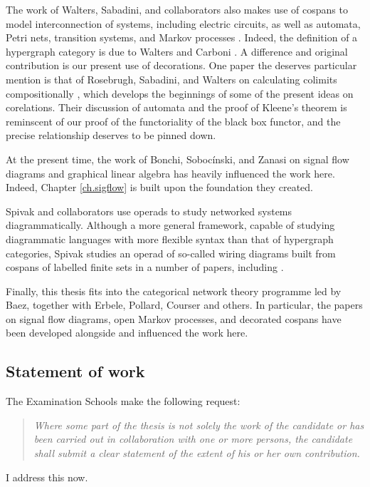 The work of Walters, Sabadini, and collaborators also makes use of cospans to
model interconnection of systems, including electric circuits, as well as
automata, Petri nets, transition systems, and Markov processes \cite{KSW,KSW2,
RSW05,RSW08,ASW}. Indeed, the definition of a hypergraph category is due to
Walters and Carboni \cite{Car91}. A difference and original contribution is our
present use of decorations. One paper the deserves particular mention is that of
Rosebrugh, Sabadini, and Walters on calculating colimits compositionally
\cite{RSW08}, which develops the beginnings of some of the present ideas on
corelations. Their discussion of automata and the proof of Kleene's theorem is
reminscent of our proof of the functoriality of the black box functor, and the
precise relationship deserves to be pinned down.

At the present time, the work of Bonchi, Soboc\'inski, and Zanasi on signal flow
diagrams and graphical linear algebra \cite{BSZ,BSZ2,BSZ3,Za} has heavily
influenced the work here. Indeed, Chapter \ref{ch.sigflow} is built upon the
foundation they created.

Spivak and collaborators use operads to study networked systems
diagrammatically. Although a more general framework, capable of studying
diagrammatic languages with more flexible syntax than that of hypergraph
categories, Spivak studies an operad of so-called wiring diagrams built from
cospans of labelled finite sets in a number of papers, including \cite{VSL,Sp,SSR}.

Finally, this thesis fits into the categorical network theory programme led by
Baez, together with Erbele, Pollard, Courser and others. In particular, the
papers \cite{BE,Erb16,BFP,Pol16,Cou16} on signal flow diagrams, open Markov
processes, and decorated cospans have been developed alongside and influenced
the work here.

\subsection*{Statement of work}

The Examination Schools make the following request:
\begin{quote}
\emph{Where some part of the thesis is not solely the work of the candidate or
has been carried out in collaboration with one or more persons, the candidate
shall submit a clear statement of the extent of his or her own contribution.}
\end{quote}
I address this now. 

